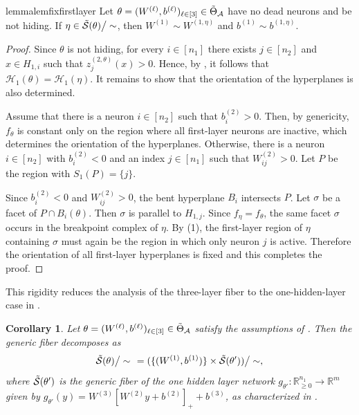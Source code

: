 \documentclass{article}
\newtheorem{lemma}[theorem]{Lemma}
\newtheorem{cor}[theorem]{Corollary}
\theoremstyle{definition}
\newcommand{\R}{\mathbb{R}}
\newcommand{\architecture}{\mathcal{A}}
\newcommand{\gparamspace}[1]{\Tilde{\Theta}_{#1}}
\newcommand{\weights}[1]{W^{(#1)}}
\newcommand{\bias}[1]{b^{(#1)}}
\newcommand{\preactivation}[1]{z^{(#1)}}
\newcommand{\hyperplanes}[2]{\mathcal{H}_{#1}(#2)}
\newcommand{\gfiber}[1]{\Tilde{\mathcal{S}}({#1})}
\newcommand{\orthant}[1]{\R_{\geq 0}^{#1}}
\newcommand{\modulo}[1]{\big/#1}
\begin{document}
\begin{restatable}{lemma}{lemfixfirstlayer}
\label{lem:fix_first_layer}
    Let $\theta = (\weights{\ell},\bias{\ell})_{\ell \in [3]} \in \gparamspace{\architecture}$ have no dead neurons and be not hiding. 
    If $\eta  \in \gfiber{\theta}\modulo{\sim}$, then 
    $\weights{1}\sim\weights{1,\eta}$ and $\bias{1} \sim \bias{1,\eta}$. 
\end{restatable} 

\begin{proof}
Since $\theta$ is not hiding, for every $i \in [n_1]$ there exists $j \in [n_2]$ and $x \in H_{1,i}$ such that $\preactivation{2,\theta}_j(x) >0$. 
Hence, by , it follows  that $\hyperplanes{1}{\theta}=\hyperplanes{1}{\eta}$. 
It remains to show that the orientation of the hyperplanes is also determined. 

    Assume that there is a neuron $i \in [n_2]$ such that $\bias{2}_i >0$. 
    Then, by genericity, $f_\theta$ is constant only on the region where all first-layer neurons are inactive, which determines the orientation of the hyperplanes. 
    Otherwise, there is a neuron $i \in [n_2]$ with $\bias{2}_i < 0$ and an index $j \in [n_1]$ such that $\weights{2}_{ij} >0$. 
    Let $P$ be the region with $S_1(P) =\{j\}$. 

    Since $\bias{2}_i < 0$ and $\weights{2}_{ij} >0$, the bent hyperplane $B_i$ intersects $P$. Let $\sigma$ be a facet of $P\cap B_i(\theta)$. Then $\sigma$ is parallel to $H_{1,j}$. Since $f_\eta=f_\theta$, the same facet $\sigma$ occurs in the breakpoint complex of $\eta$. By (1), the first-layer region of $\eta$ containing $\sigma$ must again be the region in which only neuron $j$ is active.  Therefore the orientation of all first-layer hyperplanes is fixed and this completes the proof. 
\end{proof}


This rigidity reduces the analysis of the three-layer fiber to the one-hidden-layer case in . 

\begin{cor}
\label{cor:3layer_layerwise_reduction} 
Let $\theta = (\weights{\ell}, \bias{\ell})_{\ell \in [3]} \in \gparamspace{\architecture}$ satisfy the assumptions of . 
Then the generic fiber decomposes as 
\[
\gfiber{\theta} \modulo{\sim}  \ \ = (\{ (\weights{1}, \bias{1}) \} \times \gfiber{\theta'} )\modulo{\sim} , 
\]
where $\gfiber{\theta'}$ is the generic fiber of the one hidden layer network $g_{\theta'} \colon \orthant{n_1} \to \R^m$ given by $g_{\theta'}(y) = \weights{3}[\weights{2}y + \bias{2}]_+ + \bias{3}$, 
as characterized in  
. 
\end{cor}
\end{document}
